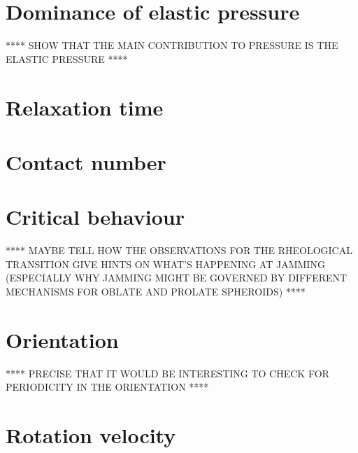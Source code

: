 \documentclass[class=report, float=false, crop=false]{standalone}
\begin{document}

\section{Dominance of elastic pressure}

**** SHOW THAT THE MAIN CONTRIBUTION TO PRESSURE IS THE ELASTIC PRESSURE ****

\section{Relaxation time}

\section{Contact number}

\section{Critical behaviour}

**** MAYBE TELL HOW THE OBSERVATIONS FOR THE RHEOLOGICAL TRANSITION GIVE HINTS ON WHAT'S HAPPENING AT JAMMING (ESPECIALLY WHY JAMMING MIGHT BE GOVERNED BY DIFFERENT MECHANISMS FOR OBLATE AND PROLATE SPHEROIDS) ****

\section{Orientation}

**** PRECISE THAT IT WOULD BE INTERESTING TO CHECK FOR PERIODICITY IN THE ORIENTATION ****

\section{Rotation velocity}

% 
\end{document}
